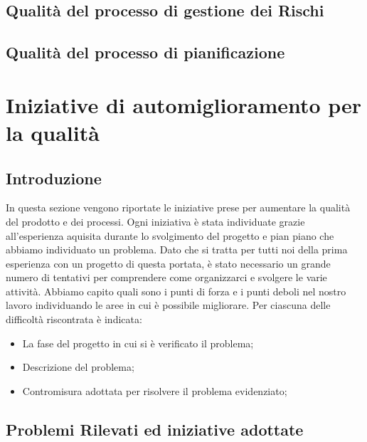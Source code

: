 \documentclass{article}
\begin{document}
\subsection{Qualità del processo di gestione dei Rischi}


\subsection{Qualità del processo di pianificazione}


\section{Iniziative di automiglioramento per la qualità}
\subsection{Introduzione}
In questa sezione vengono riportate le iniziative prese per aumentare la qualità del prodotto e dei processi.
Ogni iniziativa è stata individuate grazie all'esperienza aquisita durante lo svolgimento del progetto e pian piano che abbiamo individuato un problema.
Dato che si tratta per tutti noi della prima esperienza con un progetto di questa portata, è stato necessario un grande numero di tentativi per comprendere come organizzarci e svolgere le varie attività.
Abbiamo capito quali sono i punti di forza e i punti deboli nel nostro lavoro individuando le aree in cui è possibile migliorare. Per ciascuna delle difficoltà riscontrata è indicata:
\begin{itemize}
    \item La fase del progetto in cui si è verificato il problema;
    \item Descrizione del problema;
    \item Contromisura adottata per risolvere il problema evidenziato;
\end{itemize}

\subsection{Problemi Rilevati ed iniziative adottate}
\end{document}
